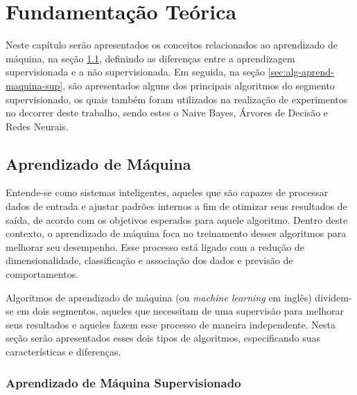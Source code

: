 \documentclass[oneside,openright,12pt]{ufsm_2015} %
\begin{document}

\chapter{Fundamentação Teórica}
\label{sec:fund-teorica}

    \par Neste capítulo serão apresentados os conceitos relacionados ao aprendizado de máquina, na seção \ref{sec:aprend-maquina}, definindo as diferenças entre a aprendizagem supervisionada e a não supervisionada. Em seguida, na seção \ref{sec:alg-aprend-maquina-sup}, são apresentados alguns dos principais algoritmos do segmento supervisionado, os quais também foram utilizados na realização de experimentos no decorrer deste trabalho, sendo estes o Naive Bayes, Árvores de Decisão e Redes Neurais.


\section{Aprendizado de Máquina}
\label{sec:aprend-maquina}

    \par Entende-se como sistemas inteligentes, aqueles que são capazes de processar dados de entrada e ajustar padrões internos a fim de otimizar seus resultados de saída, de acordo com os objetivos esperados para aquele algoritmo. Dentro deste contexto, o aprendizado de máquina foca no treinamento desses algoritmos para melhorar seu desempenho. Esse processo está ligado com a redução de dimensionalidade, classificação e associação dos dados e previsão de comportamentos.

    \par Algoritmos de aprendizado de máquina (ou \textit{machine learning} em inglês) dividem-se em dois segmentos, aqueles que necessitam de uma supervisão para melhorar seus resultados e aqueles fazem esse processo de maneira independente. Nesta seção serão apresentados esses dois tipos de algoritmos, especificando suas características e diferenças.


\subsection{Aprendizado de Máquina Supervisionado}
\label{sec:aprend-maquina-sup}
\end{document}
